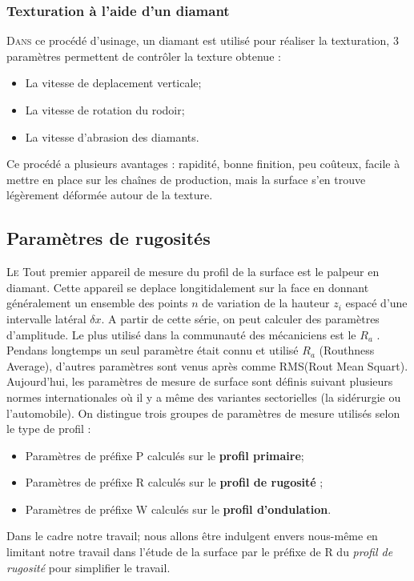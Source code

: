 \subsubsection{Texturation à l'aide d'un diamant}
\lettrine{D}{ans} ce procédé d’usinage, un diamant est utilisé pour réaliser la texturation, 3 paramètres permettent de contrôler la texture obtenue :
\begin{itemize}	
	\item La vitesse de deplacement verticale;
	\item La vitesse de rotation du rodoir;
	\item La vitesse d'abrasion des diamants.
\end{itemize}
Ce procédé a plusieurs avantages : rapidité, bonne finition, peu coûteux, facile à mettre en place sur les chaînes de production, mais la surface s’en trouve légèrement déformée autour de la texture.

\subsection{Paramètres de rugosités}
\lettrine{L}{e} Tout premier appareil de mesure du profil de la surface est le palpeur en diamant. Cette appareil se deplace longitidalement sur la face en donnant généralement un ensemble des points $n$ de variation de la hauteur $z_i$ espacé d'une intervalle latéral $\delta x$. A partir de cette série, on peut calculer des paramètres d’amplitude. Le plus utilisé dans la communauté des mécaniciens est le $R_a$ \cite{initiation}. Pendans longtemps un seul paramètre était connu et utilisé $R_a$ (Routhness Average), d'autres paramètres sont venus après comme RMS(Rout Mean Squart). Aujourd'hui, les paramètres de mesure de surface sont définis suivant plusieurs normes internationales où il y a même des variantes sectorielles (la sidérurgie ou l'automobile). On distingue trois groupes de paramètres de mesure utilisés selon le type de profil \cite{ayad1}:
\begin{itemize}
	\item Paramètres de préfixe P calculés sur le \textbf{profil primaire};
	\item Paramètres de préfixe R calculés sur le \textbf{profil de rugosité} ;
	\item Paramètres de préfixe W calculés sur le \textbf{profil d'ondulation}.
\end{itemize}
Dans le cadre notre travail; nous allons être indulgent envers nous-même en limitant notre travail dans l'étude de la surface  par le préfixe de R du \emph{profil de rugosité} pour simplifier le travail.\\

